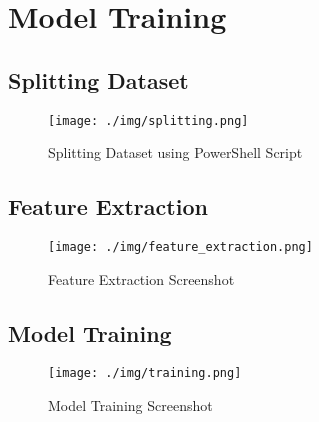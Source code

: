 \section{Model Training}
\subsection{Splitting Dataset}
\begin{figure}[H]
    \centering
    \texttt{[image: ./img/splitting.png]}
    \caption{Splitting Dataset using PowerShell Script}
\end{figure}
\subsection{Feature Extraction}
\begin{figure}[H]
    \centering
    \texttt{[image: ./img/feature\_extraction.png]}
    \caption{Feature Extraction Screenshot}
\end{figure}
\subsection{Model Training}
\begin{figure}[H]
    \centering
    \texttt{[image: ./img/training.png]}
    \caption{Model Training Screenshot}
\end{figure}